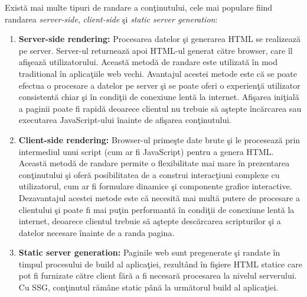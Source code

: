 \documentclass[12pt, a4paper]{report}
\begin{document}
Exist\u a mai multe tipuri de randare a con\c tinutului, cele mai populare fiind randarea \emph{server-side}, \emph{client-side} \c si  \emph{static server generation}: \cite{clientsidevssercerside}
\begin{enumerate}
	\item \textbf{Server-side rendering:} Procesarea datelor \c si generarea HTML se realizeaz\u a pe server. Server-ul returneaz\u a apoi HTML-ul generat c\u atre browser, care \^il afi\c seaz\u a utilizatorului. Aceast\u a metod\u a de randare este utilizat\u a \^in mod traditional \^in aplica\c tiile web vechi. Avantajul acestei metode este c\u a se poate efectua o procesare a datelor pe server \c si se poate oferi o experien\c t\u a utilizator consistent\u a chiar \c si \^in condi\c tii de conexiune lent\u a la internet. Afi\c sarea ini\c tial\u a a paginii poate fi rapid\u a deoarece clientul nu trebuie s\u a a\c stepte \^inc\u arcarea sau executarea JavaScript-ului \^inainte de afi\c sarea con\c tinutului.
	\item \textbf{Client-side rendering:} Browser-ul prime\c ste date brute \c si le proceseaz\u a prin intermediul unui script (cum ar fi JavaScript) pentru a genera HTML. Aceast\u a metod\u a de randare permite o flexibilitate mai mare \^in prezentarea con\c tinutului \c si ofer\u a posibilitatea de a construi interac\c tiuni complexe cu utilizatorul, cum ar fi formulare dinamice \c si componente grafice interactive. Dezavantajul acestei metode este c\u a necesit\u a mai mult\u a putere de procesare a clientului \c si poate fi mai pu\c tin performant\u a \^in condi\c tii de conexiune lent\u a la internet, deoarece clientul trebuie s\u a a\c stepte desc\u arcarea scripturilor \c si a datelor necesare \^inainte de a randa pagina.
	\item \textbf{Static server generation:} Paginile web sunt pregenerate \c si randate \^in timpul procesului de build al aplica\c tiei, rezult\^and \^in fi\c siere HTML statice care pot fi furnizate c\u atre client f\u ar\u a a fi necesar\u a procesarea la nivelul serverului. Cu SSG, con\c tinutul r\u am\^ane static p\^an\u a la urm\u atorul build al aplica\c tiei.
\end{enumerate}
\end{document}
